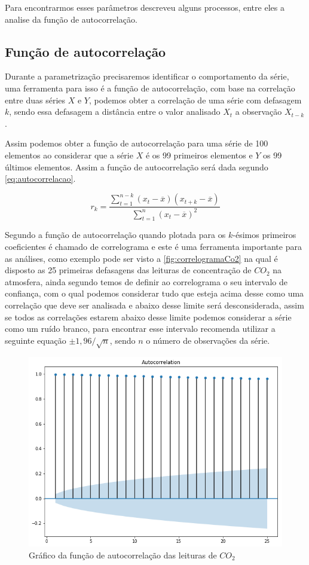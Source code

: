 \documentclass[
    12pt,
    oneside,
    a4paper,
    english,
    brazil
]{abntex2}
\begin{document}
Para encontrarmos esses parâmetros  descreveu alguns processos,
entre eles a analise da função de autocorrelação.

\subsection{Função de autocorrelação}\label{sec:corre}

Durante a parametrização precisaremos identificar o comportamento da série, uma
ferramenta para isso é a função de autocorrelação, com base na correlação entre
duas séries $X$ e $Y$, podemos obter a correlação de uma série com defasagem
$k$, sendo essa defasagem a distância entre o valor analisado $X_t$ a
observação $X_{t-k}$.

Assim podemos obter a função de autocorrelação para uma série de 100 elementos
ao considerar que a série $X$ é os 99 primeiros elementos e $Y$ os 99 últimos
elementos. Assim a função de autocorrelação será dada segundo
\autoref{eq:autocorrelacao}.

\begin{equation}
    \label{eq:autocorrelacao}
    r_k = \frac{\sum_{t=1}^{n-k}{(x_t - \overline{x})(x_{t+k} -
    \overline{x})}}{\sum_{t=1}^{n}{(x_t - \overline{x})^2}}
\end{equation}

Segundo  a função de autocorrelação quando plotada para os
$k$-ésimos primeiros coeficientes é chamado de correlograma e este é uma
ferramenta importante para as análises, como exemplo pode ser visto a
\autoref{fig:correlogramaCo2} na qual é disposto as 25 primeiras defasagens das
leituras de concentração de $CO_2$ na atmosfera, ainda segundo
 temos de definir ao correlograma o seu intervalo de
confiança, com o qual podemos considerar tudo que esteja acima desse como uma
correlação que deve ser analisada e abaixo desse limite será desconsiderada,
assim se todos as correlações estarem abaixo desse limite podemos considerar a
série como um ruído branco, para encontrar esse intervalo 
recomenda utilizar a seguinte equação $\pm{}1,96/\sqrt{n}$, sendo $n$ o número
de observações da série.

\begin{figure}
    \centering
    \caption{Gráfico da função de autocorrelação das leituras de
        $CO_2$}\label{fig:correlogramaCo2}
    \includegraphics[width=.6\linewidth]{images/acf_co2.png}
\end{figure}
\end{document}
